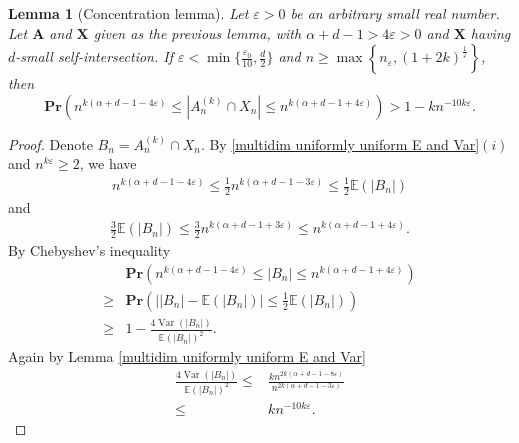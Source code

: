 \documentclass{article}
\DeclareMathOperator{\Var}{Var}
\newcommand{\bs}{\boldsymbol}
\def\Pr{\mathbf{Pr}}
\newcommand\esp[1]{\mathbb{E}\left( #1 \right)}
\newtheorem{lem}[thm]{Lemma}
\theoremstyle{remark}
\begin{document}
\begin{lem}[Concentration lemma]\label{multidim uniform concentration} Let $\varepsilon>0$ be an arbitrary small real number. Let $\bs A$ and $\bs X$ given as the previous lemma, with $\alpha+d-1>4\varepsilon>0$ and $\bs X$ having $d$-small self-intersection. If $\varepsilon < \min\{\frac{\varepsilon_0}{10},\frac{d}{2}\}$ and $n\geq \max\left\{n_\varepsilon,(1+2k)^{\frac{1}{\varepsilon}}\right\}$, then
\[\Pr\left(n^{k(\alpha + d -1 - 4\varepsilon)} \leq |A_n^{(k)}\cap  X_n| \leq n^{k(\alpha + d -1 + 4\varepsilon)}\right) > 1 - kn^{-10k\varepsilon}.\]
\end{lem}
\begin{proof}
    Denote $B_n = A_n^{(k)}\cap  X_n$. By \ref{multidim uniformly uniform E and Var}$(i)$ and $n^{k\varepsilon} \geq 2$, we have
    \begin{align*}
            n^{k(\alpha+d-1-4\varepsilon)} \leq  \frac{1}{2}n^{k(\alpha+d-1-3\varepsilon)} \leq \frac{1}{2}\esp{|B_n|}
    \end{align*}
    and
    \begin{align*}
            \frac{3}{2}\esp{|B_n|} \leq  \frac{3}{2}n^{k(\alpha+d-1+3\varepsilon)} \leq n^{k(\alpha+d-1+4\varepsilon)}.
    \end{align*}
    By Chebyshev's inequality
    \begin{align*}
            & \Pr\left(n^{k(\alpha+d-1-4\varepsilon)} \leq |B_n| \leq n^{k(\alpha + d -1 + 4\varepsilon)}\right)\\
            \geq & \Pr\left(\Big||B_n|-\esp{|B_n|}\Big| \leq\frac{1}{2}\esp{|B_n|}\right)\\
            \geq & 1-\frac{4\Var(|B_n|)}{\esp{|B_n|}^2}.
    \end{align*}
    Again by Lemma \ref{multidim uniformly uniform E and Var}
    \begin{align*}
        \frac{4\Var(|B_n|)}{\esp{|B_n|}^2} \leq & \frac{kn^{2k(\alpha+d-1-8\varepsilon)}}{n^{2k(\alpha+d-1-3\varepsilon)}}\\
        \leq & kn^{-10k\varepsilon}.
    \end{align*}
\end{proof}
\end{document}
